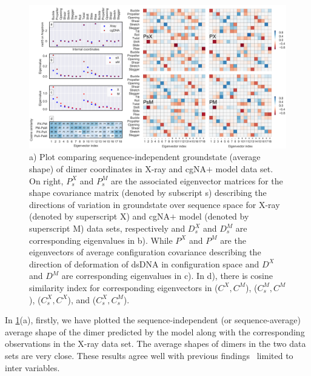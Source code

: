 \begin{figure}[htb!]
	\begin{center}
	\centering\includegraphics[scale=0.057]{./Xray_images/PP.png}
	\centering\caption{a) Plot comparing sequence-independent groundstate (average shape) of dimer coordinates in X-ray and cgNA$+$ model data set. On right, $P_s^X$ and $P_s^M$ are the associated eigenvector matrices for the shape covariance matrix (denoted by subscript s) describing the directions of variation in groundstate over sequence space for X-ray (denoted by superscript X) and cgNA$+$ model (denoted by superscript M) data sets, respectively and $D_s^X$ and $D_s^M$ are corresponding eigenvalues in b). While $P^X$ and $P^M$ are the eigenvectors of average configuration covariance 
	describing the direction of deformation of dsDNA in configuration space and $D^X$ and $D^M$ are corresponding eigenvalues in c). In d), there is cosine similarity index for corresponding eigenvectors in ($C^X,C^M$), ($C_s^M,C^M$), ($C_s^X,C^X$), and ($C_s^X,C_s^M$).  
	}
\label{fig:PMPX}
\end{center}
\end{figure}

In \cref{fig:PMPX}(a), firstly, we have plotted the sequence-independent (or sequence-average) average shape of the dimer predicted by the model along with the corresponding observations in the X-ray data set. The average shapes of dimers in the two data sets are very close.
These results agree well with previous findings~\cite{perez2008towards,fujii2007sequence,perez2004relative,olson2006dna,dans2012exploring,madhumalar2005sequence} limited to inter variables.

